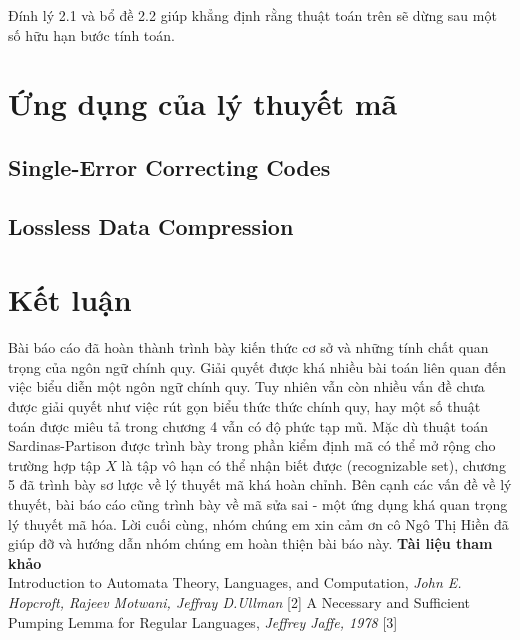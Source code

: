 \documentclass[14pt]{extreport}
\begin{document}
Đính lý 2.1 và bổ đề 2.2 giúp khẳng định rằng thuật toán trên sẽ dừng sau một số hữu hạn bước tính toán.

\chapter{Ứng dụng của lý thuyết mã}
\section{Single-Error Correcting Codes}
\section{Lossless Data Compression}




\chapter{Kết luận}
Bài báo cáo đã hoàn thành trình bày kiến thức cơ sở và những tính chất quan trọng của ngôn ngữ chính quy. Giải quyết được khá nhiều bài toán liên quan đến việc biểu diễn một ngôn ngữ chính quy. Tuy nhiên vẫn còn nhiều vấn đề chưa được giải quyết như việc rút gọn biểu thức thức chính quy, hay một số thuật toán được miêu tả trong chương 4 vẫn có độ phức tạp mũ. Mặc dù thuật toán Sardinas-Partison được trình bày trong phần kiểm định mã có thể mở rộng cho trường hợp tập $X$ là tập vô hạn có thể nhận biết được (recognizable set), chương 5 đã trình bày sơ lược về lý thuyết mã khá hoàn chỉnh. Bên cạnh các vấn đề về lý thuyết, bài báo cáo cũng trình bày về mã sửa sai - một ứng dụng khá quan trọng lý thuyết mã hóa.
Lời cuối cùng, nhóm chúng em xin cảm ơn cô Ngô Thị Hiền đã giúp đỡ và hướng dẫn nhóm chúng em hoàn thiện bài báo này.
\newpage
{\huge \textbf{Tài liệu tham khảo}} \\
[1] Introduction to Automata Theory, Languages, and Computation, \textit{John E. Hopcroft, Rajeev Motwani, Jeffray D.Ullman}
[2] A Necessary and Sufficient Pumping Lemma for Regular Languages, \textit{Jeffrey Jaffe, 1978}
[3]
\end{document}
